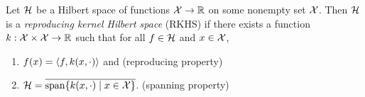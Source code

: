 Let \(\mathcal{H}\) be a Hilbert space of functions \(\mathcal{X} \to \mathbb{R}\) on some nonempty set \(\mathcal{X}\).
Then \(\mathcal{H}\) is a \textit{reproducing kernel Hilbert space} (RKHS) if there exists a function \(k : \mathcal{X} \times \mathcal{X} \to \mathbb{R}\) such that for all \(f \in \mathcal{H}\) and \(x \in \mathcal{X}\),
\begin{enumerate}
    \item \(f(x) = \left\langle f, k(x,\cdot) \right\rangle\) and
    \hfill (reproducing property)
    \item \(\mathcal{H} = \overline{\operatorname{span}\{k(x,\cdot) \mid x \in \mathcal{X}\}}\).
    \hfill (spanning property)
\end{enumerate}
